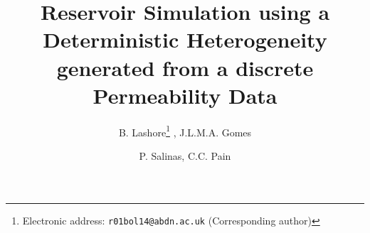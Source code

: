 \documentclass{article}
\begin{document}
\title{Reservoir Simulation using a Deterministic Heterogeneity generated from a discrete Permeability Data}


\author{B. Lashore\thanks{Electronic address: \texttt{r01bol14@abdn.ac.uk} (Corresponding author)} , J.L.M.A. Gomes}

\author{P. Salinas, C.C. Pain}

\end{document}
